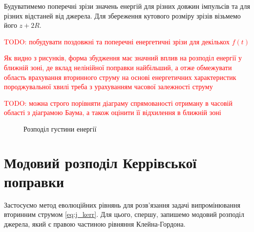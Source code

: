 Будуватимемо поперечні зрізи значень енергій для різних довжин імпульсів та 
для різних відстаней від джерела. Для збереження кутового розміру зрізів 
візьмемо його $ z + 2R $.

\textcolor{red}{ TODO: побудувати поздовжні та поперечні енергетичні зрізи
для декількох $ f(t) $ }

\textcolor{red}{ Як видно з рисунків, форма збудження має значний вплив на 
розподіл енергії у ближній зоні, де вклад нелінійної поправки найбільший, а 
отже обмежувати область врахування вторинного струму на основі енергетичних 
характеристик породжувальної хвилі треба з урахуванням часової залежності 
струму }

\textcolor{red}{ TODO: можна строго порівняти діаграму спрямованості 
отриману в часовій області з діаграмою Баума, а також оцінити її відхилення 
в ближній зоні }

\begin{figure}
\caption{Розподіл густини енергії}
\label{fig:gauss_shape}
\end{figure}

\section{Модовий розподіл Керрівської поправки}

Застосуємо метод еволюційних рівнянь для розв'язання задачі випромінювання 
вторинним струмом \eqref{eq:j_kerr}. Для цього, спершу, запишемо модовий
розподіл джерела, який є правою частиною рівняння Клейна-Гордона. 

